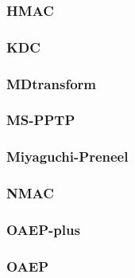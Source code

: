 \begin{frame}\frametitle{HMAC}
\begin{figure}
\begin{center}

\end{center}
\end{figure}
\end{frame}
\begin{frame}\frametitle{KDC}
\begin{figure}
\begin{center}

\end{center}
\end{figure}
\end{frame}
\begin{frame}\frametitle{MDtransform}
\begin{figure}
\begin{center}

\end{center}
\end{figure}
\end{frame}
\begin{frame}\frametitle{MS-PPTP}
\begin{figure}
\begin{center}

\end{center}
\end{figure}
\end{frame}
\begin{frame}\frametitle{Miyaguchi-Preneel}
\begin{figure}
\begin{center}

\end{center}
\end{figure}
\end{frame}
\begin{frame}\frametitle{NMAC}
\begin{figure}
\begin{center}

\end{center}
\end{figure}
\end{frame}
\begin{frame}\frametitle{OAEP-plus}
\begin{figure}
\begin{center}

\end{center}
\end{figure}
\end{frame}
\begin{frame}\frametitle{OAEP}
\begin{figure}
\begin{center}

\end{center}
\end{figure}
\end{frame}
